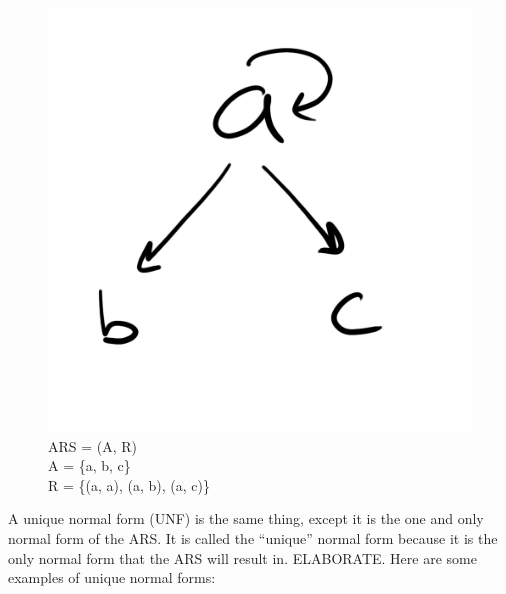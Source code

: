 \documentclass{article}
\begin{document}
{\begin{figure}[h!]
  \centering
  \includegraphics[scale=0.06]{gen10}
  \caption[] {
     ARS = (A, R) \\ A = \{a, b, c\} \\ R = \{(a, a), (a, b), (a, c)\}
    \endtabular}
\end{figure}

\medskip\noindent
A unique normal form (UNF) is the same thing, except it is the one and only normal form of the ARS. It is called the “unique” normal form because it is the only normal form that the ARS will result in. ELABORATE. Here are some examples of unique normal forms:

}
\end{document}
